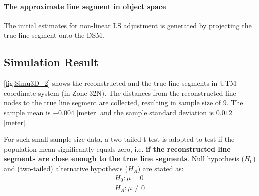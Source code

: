 \paragraph{The approximate line segment in object space}
The initial estimates for non-linear LS adjustment is generated by projecting the true line segment onto the DSM.%

\subsection{Simulation Result}
\label{subsec:simuresult}



\cref{fig:Simu3D_2} shows the reconstructed and the true line segments in UTM coordinate system (in Zone 32N). %
The distances from the reconstructed line nodes to the true line segment are collected, resulting in sample size of $9$. The sample mean is $-0.004$ [meter] and the sample standard deviation is $0.012$ [meter]. %

For such small sample size data, a two-tailed t-test is adopted to test if the population mean significantly equals zero, i.e. \textbf{if the reconstructed line segments are close enough to the true line segments}. Null hypothesis ($H_0$) and (two-tailed) alternative hypothesis ($H_A$) are stated as:
\begin{equation*}
\begin{split}
H_0: \mu=0\\
H_A: \mu\neq0
\end{split}
\end{equation*}

